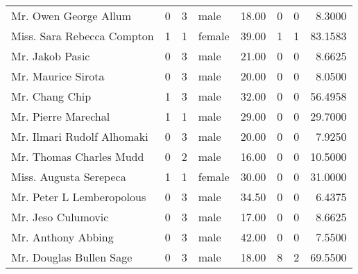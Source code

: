 \begin{tabular}{lrrlrrrr}
Mr. Owen George Allum                              &         0 &       3 &    male &  18.00 &                        0 &                        0 &    8.3000 \\
Miss. Sara Rebecca Compton                         &         1 &       1 &  female &  39.00 &                        1 &                        1 &   83.1583 \\
Mr. Jakob Pasic                                    &         0 &       3 &    male &  21.00 &                        0 &                        0 &    8.6625 \\
Mr. Maurice Sirota                                 &         0 &       3 &    male &  20.00 &                        0 &                        0 &    8.0500 \\
Mr. Chang Chip                                     &         1 &       3 &    male &  32.00 &                        0 &                        0 &   56.4958 \\
Mr. Pierre Marechal                                &         1 &       1 &    male &  29.00 &                        0 &                        0 &   29.7000 \\
Mr. Ilmari Rudolf Alhomaki                         &         0 &       3 &    male &  20.00 &                        0 &                        0 &    7.9250 \\
Mr. Thomas Charles Mudd                            &         0 &       2 &    male &  16.00 &                        0 &                        0 &   10.5000 \\
Miss. Augusta Serepeca                             &         1 &       1 &  female &  30.00 &                        0 &                        0 &   31.0000 \\
Mr. Peter L Lemberopolous                          &         0 &       3 &    male &  34.50 &                        0 &                        0 &    6.4375 \\
Mr. Jeso Culumovic                                 &         0 &       3 &    male &  17.00 &                        0 &                        0 &    8.6625 \\
Mr. Anthony Abbing                                 &         0 &       3 &    male &  42.00 &                        0 &                        0 &    7.5500 \\
Mr. Douglas Bullen Sage                            &         0 &       3 &    male &  18.00 &                        8 &                        2 &   69.5500 \\

\end{tabular}
